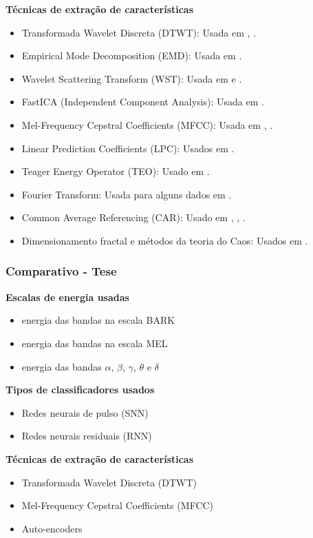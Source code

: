 \begin{frame}[allowframebreaks]
	\par \textbf{Técnicas de extração de características}
	\begin{itemize}
		\item Transformada Wavelet Discreta (DTWT): Usada em \cite{MahapatraNrushinghCharan2023Ecoi}, \cite{Hernandez-Del-ToroTonatiuh2021TaEB}.
		\item Empirical Mode Decomposition (EMD): Usada em \cite{ParkHyeong-jun2023Mcoi}.
		\item Wavelet Scattering Transform (WST): Usada em \cite{AbdulghaniMokhlesM2023ISCU} e \cite{Panachakel_2019}.
		\item FastICA (Independent Component Analysis): Usada em \cite{MahapatraNrushinghCharan2022MCoI}.
		\item Mel-Frequency Cepstral Coefficients (MFCC): Usada em \cite{ali2022speech}, \cite{WOS:000525844000004}.
		\item Linear Prediction Coefficients (LPC): Usados em \cite{ali2022speech}.
		\item Teager Energy Operator (TEO): Usado em \cite{MOCTEZUMA2019201}.
		\item Fourier Transform: Usada para alguns dados em \cite{s23125575}.
		\item Common Average Referencing (CAR): Usado em \cite{AgarwalPrabhakar2022Ebia}, \cite{Hernandez-Del-ToroTonatiuh2021TaEB}, \cite{MOCTEZUMA2019201}.
		\item Dimensionamento fractal e métodos da teoria do Caos: Usados em \cite{Hernandez-Del-ToroTonatiuh2021TaEB}.
	\end{itemize}
\end{frame}
\begin{frame}
	\frametitle{Comparativo - Tese}
		\par \textbf{Escalas de energia usadas}
		\begin{itemize}
			\item energia das bandas na escala BARK
			\item energia das bandas na escala MEL
			\item energia das bandas $\alpha$, $\beta$, $\gamma$, $\theta$ e $\delta$
		\end{itemize}
		
		\par \textbf{Tipos de classificadores usados}
		\begin{itemize}
			\item Redes neurais de pulso (SNN)
			\item Redes neurais residuais (RNN)
		\end{itemize}
		
		\par \textbf{Técnicas de extração de características}
		\begin{itemize}
			\item Transformada Wavelet Discreta (DTWT)
			\item Mel-Frequency Cepstral Coefficients (MFCC)
			\item Auto-encoders
		\end{itemize}
\end{frame}